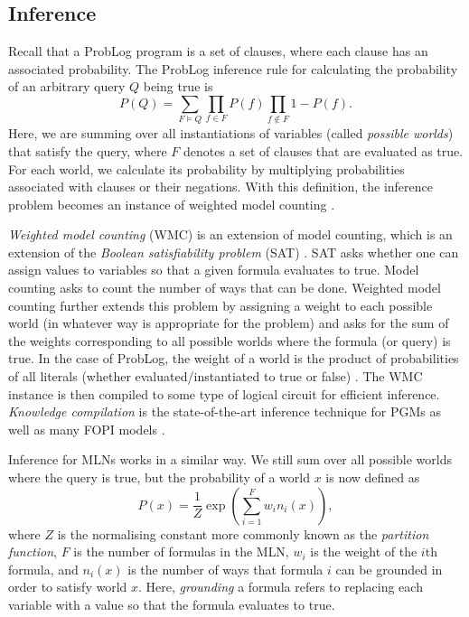 \documentclass{article}
\begin{document}
\subsection{Inference}

Recall that a ProbLog program is a set of clauses, where each clause has an
associated probability. The ProbLog inference rule
\cite{DBLP:series/synthesis/2016Raedt,DBLP:conf/iclp/Sato95} for calculating the
probability of an arbitrary query $Q$ being true is
\[
  P(Q) = \sum_{F \models Q} \prod_{f \in F} P(f) \prod_{f \not\in F} 1 -
  P(f).
\]
Here, we are summing over all instantiations of variables (called \emph{possible
worlds}) that satisfy the query, where $F$ denotes a set of clauses that are
evaluated as true. For each world, we calculate its probability by multiplying
probabilities associated with clauses or their negations. With this
definition, the inference problem becomes an instance of weighted model
counting \cite{DBLP:series/synthesis/2016Raedt}.

\emph{Weighted model counting} (WMC) is an extension of model counting, which is
an extension of the \emph{Boolean satisfiability problem} (SAT)
\cite{DBLP:journals/ai/ChaviraD08}. SAT asks whether one can assign values to
variables so that a given formula evaluates to true. Model counting asks to
count the number of ways that can be done. Weighted model counting further
extends this problem by assigning a weight to each possible world (in whatever
way is appropriate for the problem) and asks for the sum of the weights
corresponding to all possible worlds where the formula (or query) is true. In
the case of ProbLog, the weight of a world is the product of probabilities of
all literals (whether evaluated/instantiated to true or false)
\cite{DBLP:series/synthesis/2016Raedt}. The WMC instance is then compiled to
some type of logical circuit for efficient inference. \emph{Knowledge
  compilation} \cite{DBLP:conf/ijcai/BroeckTMDR11} is the state-of-the-art
inference technique for PGMs as well as many FOPI models
\cite{DBLP:series/synthesis/2016Raedt}.

Inference for MLNs works in a similar way. We still sum over all possible
worlds where the query is true, but the probability of a world $x$ is now
defined as
\[
  P(x) = \frac{1}{Z} \exp \left( \sum_{i=1}^F w_i n_i(x) \right),
\]
where $Z$ is the normalising constant more commonly known as the \emph{partition
function}, $F$ is the number of formulas in the MLN, $w_i$ is the weight of the
$i$th formula, and $n_i(x)$ is the number of ways that formula $i$ can be
grounded in order to satisfy world $x$. Here, \emph{grounding} a formula refers
to replacing each variable with a value so that the formula evaluates to true.
\end{document}
